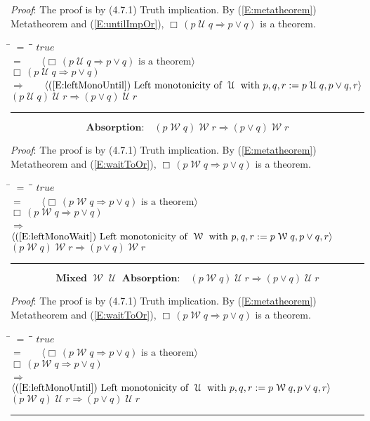 \documentclass[12pt, fleqn, leqno]{article}
\newcommand{\lgap}{2pt}                             %
\newcommand{\mymathindent}{24pt}                    %
\newcommand{\impl}{\ensuremath{\Rightarrow}}        %
\newcommand{\Until}{\;\mathcal{U}\;}
\newcommand{\Wait}{\;\mathcal{W}\;}
\newcommand{\Always}{\Box\,}
\newcommand{\myqed}{\rule[-.23ex]{1.2ex}{2.0ex}}
\newcommand{\myqedtab}{\hspace{384pt}}              %
\newcommand{\Gll} {\langle}                         %
\newcommand{\Ggg} {\rangle}                         %
\newcommand{\Hint}[1]     {\ \ \ $\Gll              \mbox{#1} \Ggg$ }   %
\begin{document}
\emph{Proof}: The proof is by (4.7.1) Truth implication.
By (\ref{E:metatheorem}) Metatheorem and (\ref{E:untilImpOr}), $\Always (p\Until q\impl p\lor q)$ is a theorem.
\begin{tabbing}
\hspace{\mymathindent} \= $= \;$ \= \myqedtab \= \kill
  \> \>   $true$\\[\lgap]
  \> $=$ \> \Hint{$\Always (p\Until q\impl p\lor q)$ is a theorem} \\[\lgap]
  \> \>   $\Always (p\Until q\impl p\lor q)$\\[\lgap]
  \> $\impl$  \>  \Hint{(\ref{E:leftMonoUntil}) Left monotonicity of $\Until$ with $p,q,r := p\Until q, p\lor q, r$}\\[\lgap]
  \> \>   $(p \Until q) \Until r \impl (p \lor q) \Until r$ \quad \myqed
\end{tabbing}

\begin{equation}\label{E:waitImpAbsR}
\textbf{Absorption:}\quad (p \Wait q) \Wait r \impl (p \lor q) \Wait r
\end{equation}

\emph{Proof}: The proof is by (4.7.1) Truth implication.
By (\ref{E:metatheorem}) Metatheorem and (\ref{E:waitToOr}), $\Always (p\Wait q\impl p\lor q)$ is a theorem.
\begin{tabbing}
\hspace{\mymathindent} \= $= \;$ \= \myqedtab \= \kill
  \> \>   $true$\\[\lgap]
  \> $=$ \> \Hint{$\Always (p\Wait q\impl p\lor q)$ is a theorem} \\[\lgap]
  \> \>   $\Always (p\Wait q\impl p\lor q)$\\[\lgap]
  \> $\impl$  \>  \Hint{(\ref{E:leftMonoWait}) Left monotonicity of $\Wait$ with $p,q,r := p\Wait q, p\lor q, r$}\\[\lgap]
  \> \>   $(p \Wait q) \Wait r \impl (p \lor q) \Wait r$ \quad \myqed
\end{tabbing}

\begin{equation}\label{E:mixuntilImpAbsR}
\textbf{Mixed $\Wait\Until$ Absorption:}\quad (p \Wait q) \Until r \impl (p \lor q) \Until r
\end{equation}

\emph{Proof}: The proof is by (4.7.1) Truth implication.
By (\ref{E:metatheorem}) Metatheorem and (\ref{E:waitToOr}), $\Always (p\Wait q\impl p\lor q)$ is a theorem.
\begin{tabbing}
\hspace{\mymathindent} \= $= \;$ \= \myqedtab \= \kill
  \> \>   $true$\\[\lgap]
  \> $=$ \> \Hint{$\Always (p\Wait q\impl p\lor q)$ is a theorem} \\[\lgap]
  \> \>   $\Always (p\Wait q\impl p\lor q)$\\[\lgap]
  \> $\impl$  \>  \Hint{(\ref{E:leftMonoUntil}) Left monotonicity of $\Until$ with $p,q,r := p\Wait q, p\lor q, r$}\\[\lgap]
  \> \>   $(p \Wait q) \Until r \impl (p \lor q) \Until r$ \quad \myqed
\end{tabbing}
\end{document}
